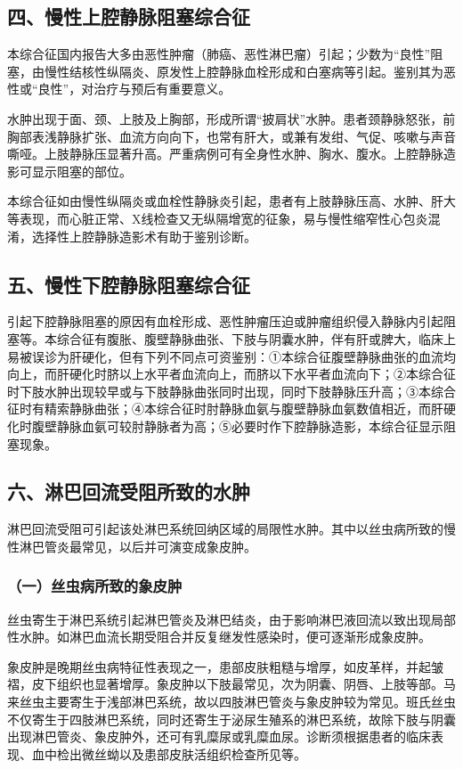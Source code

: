 \subsection{四、慢性上腔静脉阻塞综合征}

本综合征国内报告大多由恶性肿瘤（肺癌、恶性淋巴瘤）引起；少数为“良性”阻塞，由慢性结核性纵隔炎、原发性上腔静脉血栓形成和白塞病等引起。鉴别其为恶性或“良性”，对治疗与预后有重要意义。

水肿出现于面、颈、上肢及上胸部，形成所谓“披肩状”水肿。患者颈静脉怒张，前胸部表浅静脉扩张、血流方向向下，也常有肝大，或兼有发绀、气促、咳嗽与声音嘶哑。上肢静脉压显著升高。严重病例可有全身性水肿、胸水、腹水。上腔静脉造影可显示阻塞的部位。

本综合征如由慢性纵隔炎或血栓性静脉炎引起，患者有上肢静脉压高、水肿、肝大等表现，而心脏正常、X线检查又无纵隔增宽的征象，易与慢性缩窄性心包炎混淆，选择性上腔静脉造影术有助于鉴别诊断。

\subsection{五、慢性下腔静脉阻塞综合征}

引起下腔静脉阻塞的原因有血栓形成、恶性肿瘤压迫或肿瘤组织侵入静脉内引起阻塞等。本综合征有腹胀、腹壁静脉曲张、下肢与阴囊水肿，伴有肝或脾大，临床上易被误诊为肝硬化，但有下列不同点可资鉴别：①本综合征腹壁静脉曲张的血流均向上，而肝硬化时脐以上水平者血流向上，而脐以下水平者血流向下；②本综合征时下肢水肿出现较早或与下肢静脉曲张同时出现，同时下肢静脉压升高；③本综合征时有精索静脉曲张；④本综合征时肘静脉血氨与腹壁静脉血氨数值相近，而肝硬化时腹壁静脉血氨可较肘静脉者为高；⑤必要时作下腔静脉造影，本综合征显示阻塞现象。

\subsection{六、淋巴回流受阻所致的水肿}

淋巴回流受阻可引起该处淋巴系统回纳区域的局限性水肿。其中以丝虫病所致的慢性淋巴管炎最常见，以后并可演变成象皮肿。

\subsubsection{（一）丝虫病所致的象皮肿}

丝虫寄生于淋巴系统引起淋巴管炎及淋巴结炎，由于影响淋巴液回流以致出现局部性水肿。如淋巴血流长期受阻合并反复继发性感染时，便可逐渐形成象皮肿。

象皮肿是晚期丝虫病特征性表现之一，患部皮肤粗糙与增厚，如皮革样，并起皱褶，皮下组织也显著增厚。象皮肿以下肢最常见，次为阴囊、阴唇、上肢等部。马来丝虫主要寄生于浅部淋巴系统，故以四肢淋巴管炎与象皮肿较为常见。班氏丝虫不仅寄生于四肢淋巴系统，同时还寄生于泌尿生殖系的淋巴系统，故除下肢与阴囊出现淋巴管炎、象皮肿外，还可有乳糜尿或乳糜血尿。诊断须根据患者的临床表现、血中检出微丝蚴以及患部皮肤活组织检查所见等。

